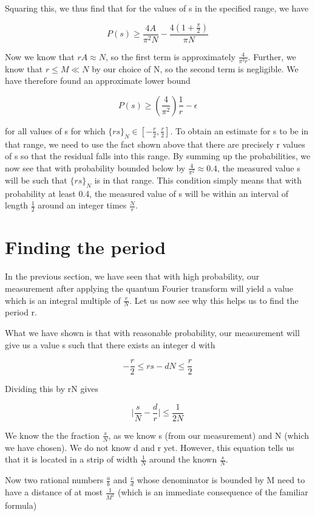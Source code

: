 \documentclass[a4paper, draft]{article}
\theoremstyle{own}
\theoremstyle{remark}
\begin{document}
Squaring this, we thus find that for the values of s in the specified range, we have

$$
P(s) \geq \frac{4A}{\pi^2 N}  - \frac{4(1+\frac{\pi}{2})}{\pi N}
$$

Now we know that $r A \approx N$, so the first term is approximately $\frac{4}{\pi^2 r}$. Further, we know that $r \leq M \ll N$ by our choice of N, so the second term is negligible. We have therefore found an approximate lower bound

$$
P(s) \geq (\frac{4}{\pi^2}) \frac{1}{r} - \epsilon 
$$

for all values of s for which $\{rs\}_N \in [-\frac{r}{2}, \frac{r}{2}]$. To obtain an estimate for s to be in that range, we need to use the fact shown above that there are precisely r values of s so that the residual falls into this range. By summing up the probabilities, we now see that with probability bounded below by $\frac{4}{\pi^2} \approx 0.4$, the measured value s will be such that $\{rs\}_N$ is in that range. This condition simply means that with probability at least 0.4, the measured value of s will be within an interval of length $\frac{1}{2}$ around an integer times $\frac{N}{r}$. 

\section{Finding the period}

In the previous section, we have seen that with high probability, our measurement after applying the quantum Fourier transform will yield a value which is an integral multiple of $\frac{r}{N}$. Let us now see why this helps us to find the period r.

What we have shown is that with reasonable probability, our measurement will give us a value s such that there exists an integer d with 

$$
-\frac{r}{2} \leq rs - dN \leq \frac{r}{2}
$$

Dividing this by rN gives

$$
\big|  \frac{s}{N} - \frac{d}{r} \big| \leq \frac{1}{2N} 
$$

We know the the fraction $\frac{s}{N}$, as we know s (from our measurement) and N (which we have chosen). We do not know d and r yet. However, this equation tells us that it is located in a strip of width $\frac{1}{N}$ around the known $\frac{s}{N}$. 

Now two rational numbers $\frac{a}{b}$ and $\frac{c}{d}$ whose denominator is bounded by M need to have a distance of at most $\frac{1}{M^2}$ (which is an immediate consequence of the familiar formula)
\end{document}
